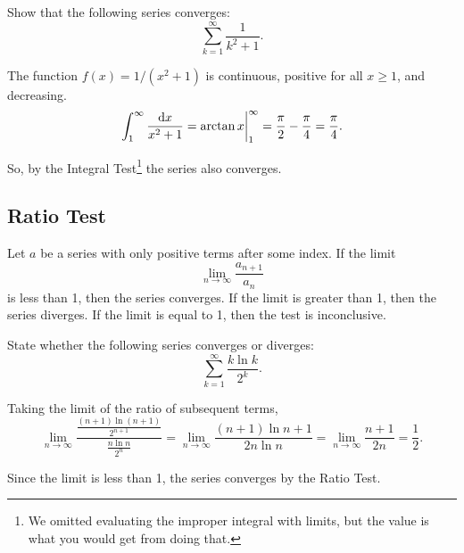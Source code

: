 \begin{example}
	Show that the following series converges:
	\begin{equation*}
		\sum_{k=1}^{\infty}{\frac{1}{k^2+1}}.
	\end{equation*}
\end{example}
\begin{answer}
	The function $f(x)=1/(x^2+1)$ is continuous, positive for all $x \geq 1$, and decreasing.
	\begin{equation*}
		\int_{1}^{\infty}{\frac{\mathrm{d} x}{x^2+1}} = \arctan{x}\biggr\rvert_{1}^{\infty} = \frac{\pi}{2} - \frac{\pi}{4} = \frac{\pi}{4}.
	\end{equation*}
	
	So, by the Integral Test\footnote{We omitted evaluating the improper integral with limits, but the value is what you would get from doing that.} the series also converges.
\end{answer}

\subsection{Ratio Test}
\begin{lemma}
	Let $a$ be a series with only positive terms after some index.
	If the limit
	\begin{equation*}
		\lim_{n\to\infty}{\frac{a_{n+1}}{a_n}}
	\end{equation*}
	is less than 1, then the series converges.
	If the limit is greater than 1, then the series diverges.
	If the limit is equal to 1, then the test is inconclusive.
\end{lemma}

\begin{example}
	State whether the following series converges or diverges:
	\begin{equation*}
		\sum_{k=1}^{\infty}{\frac{k\ln{k}}{2^k}}.
	\end{equation*}
\end{example}
\begin{answer}
	Taking the limit of the ratio of subsequent terms,
	\begin{equation*}
		\lim_{n\to\infty}{\frac{\frac{(n+1)\ln{(n+1)}}{2^{n+1}}}{\frac{n\ln{n}}{2^n}}} = \lim_{n\to\infty}{\frac{(n+1)\ln{n+1}}{2n\ln{n}}} = \lim_{n\to\infty}{\frac{n+1}{2n}} = \frac{1}{2}.
	\end{equation*}
	
	Since the limit is less than 1, the series converges by the Ratio Test.
\end{answer}

